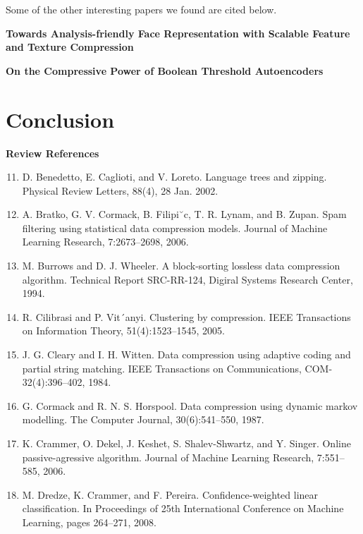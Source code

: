 \documentclass{article}
\begin{document}
Some of the other interesting papers we found are cited below.

\textbf{Towards Analysis-friendly Face Representation with Scalable Feature and Texture Compression \cite{wang2020towards}}

\textbf{On the Compressive Power of Boolean Threshold Autoencoders \cite{melkman2020compressive}}

\section{Conclusion}






\textbf{Review References}

\begin{enumerate}
	\setcounter{enumi}{10}
	
	\item D. Benedetto, E. Caglioti, and V. Loreto. Language
	trees and zipping. Physical Review Letters, 88(4), 28
	Jan. 2002.
	
	\item A. Bratko, G. V. Cormack, B. Filipi˘c, T. R. Lynam,
	and B. Zupan. Spam filtering using statistical data
	compression models. Journal of Machine Learning
	Research, 7:2673–2698, 2006.
	
	\item M. Burrows and D. J. Wheeler. A block-sorting
	lossless data compression algorithm. Technical Report
	SRC-RR-124, Digiral Systems Research Center, 1994.
	
	\item R. Cilibrasi and P. Vit´anyi. Clustering by
	compression. IEEE Transactions on Information
	Theory, 51(4):1523–1545, 2005.
	
	\item J. G. Cleary and I. H. Witten. Data compression using
	adaptive coding and partial string matching. IEEE
	Transactions on Communications,
	COM-32(4):396–402, 1984.
	
	\item G. Cormack and R. N. S. Horspool. Data compression
	using dynamic markov modelling. The Computer
	Journal, 30(6):541–550, 1987.
	
	\item K. Crammer, O. Dekel, J. Keshet, S. Shalev-Shwartz,
	and Y. Singer. Online passive-agressive algorithm.
	Journal of Machine Learning Research, 7:551–585,
	2006.

	\item M. Dredze, K. Crammer, and F. Pereira.
	Confidence-weighted linear classification. In
	Proceedings of 25th International Conference on
	Machine Learning, pages 264–271, 2008.


\end{enumerate}
\end{document}
